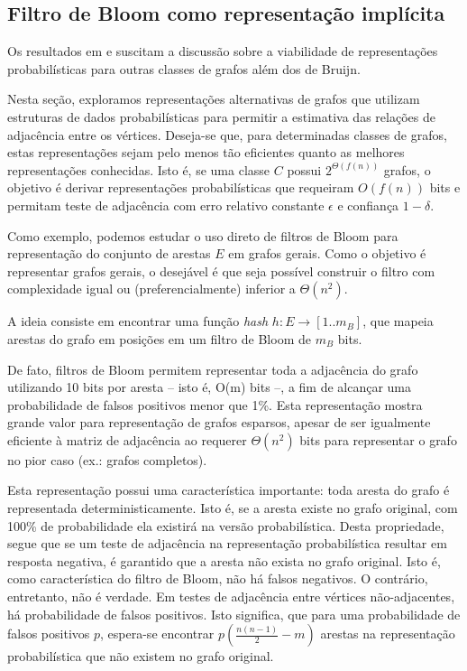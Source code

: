 
\subsection{Filtro de Bloom como representação implícita}\label{sec:graphs:repres}

Os resultados em \cite{pell2012scaling} e \cite{zhang2014these} suscitam a discussão sobre a viabilidade de representações probabilísticas para outras classes de grafos além dos de Bruijn.

Nesta seção, exploramos representações alternativas de grafos que utilizam estruturas de dados probabilísticas para permitir a estimativa das relações de adjacência entre os vértices. Deseja-se que, para determinadas classes de grafos, estas representações sejam pelo menos tão eficientes quanto as melhores representações conhecidas. Isto é, se uma classe $C$ possui $2^{\Theta(f(n))}$ grafos, o objetivo é derivar representações probabilísticas que requeiram $O(f(n))$ bits e permitam teste de adjacência com erro relativo constante $\epsilon$ e confiança $1 - \delta$.

Como exemplo, podemos estudar o uso direto de filtros de Bloom para representação do conjunto de arestas $E$ em grafos gerais. Como o objetivo é representar grafos gerais, o desejável é que seja possível construir o filtro com complexidade igual ou (preferencialmente) inferior a $\Theta(n^2)$. 

A ideia consiste em encontrar uma função \emph{hash} $h: E \to [1..m_B]$, que mapeia arestas do grafo em posições em um filtro de Bloom de $m_B$ bits.

De fato, filtros de Bloom permitem representar toda a adjacência do grafo utilizando 10 bits por aresta -- isto é, O(m) bits --, a fim de alcançar uma probabilidade de falsos positivos menor que 1\%. Esta representação mostra grande valor para representação de grafos esparsos, apesar de ser igualmente eficiente à matriz de adjacência ao requerer $\Theta(n^2)$ bits para representar o grafo no pior caso (ex.: grafos completos).

Esta representação possui uma característica importante: toda aresta do grafo é representada deterministicamente. Isto é, se a aresta existe no grafo original, com 100\% de probabilidade ela existirá na versão probabilística. Desta propriedade, segue que se um teste de adjacência na representação probabilística resultar em resposta negativa, é garantido que a aresta não exista no grafo original. Isto é, como característica do filtro de Bloom, não há falsos negativos. O contrário, entretanto, não é verdade. Em testes de adjacência entre vértices não-adjacentes, há probabilidade de falsos positivos. Isto significa, que para uma probabilidade de falsos positivos $p$, espera-se encontrar $p(\frac{n(n-1)}{2}-m)$ arestas na representação probabilística que não existem no grafo original.

